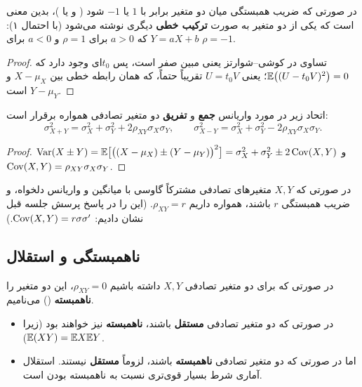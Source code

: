 \begin{theorem}
در صورتی که ضریب همبستگی میان دو متغیر برابر با $1$ یا $-1$ شود ( و یا )، بدین معنی است که یکی از دو متغیر به صورت \textbf{ترکیب خطی} دیگری نوشته می‌شود (با احتمال ۱): $Y=aX+b$ که $a>0$ برای $\rho=1$ و $a<0$ برای $\rho=-1$.
\end{theorem}
\begin{proof}
تساوی در کوشی--شوارتز یعنی مبین صفر است، پس $t_0$ای وجود دارد که $\mathbb{E}\big((U-t_0V)^2\big)=0$؛ یعنی $U=t_0V$ تقریباً حتماً، که همان رابطه خطی بین $X-\mu_X$ و $Y-\mu_Y$ است.
\end{proof}

\begin{theorem}
اتحاد زیر در مورد واریانس \textbf{جمع} و \textbf{تفریق} دو متغیر تصادفی همواره برقرار است:
\[
\sigma_{X+Y}^2=\sigma_X^2+\sigma_Y^2+2\rho_{XY}\sigma_X\sigma_Y,\qquad
\sigma_{X-Y}^2=\sigma_X^2+\sigma_Y^2-2\rho_{XY}\sigma_X\sigma_Y .
\]
\end{theorem}
\begin{proof}
$\operatorname{Var}(X\pm Y)=\mathbb{E}\big[\big((X-\mu_X)\pm(Y-\mu_Y)\big)^2\big]=\sigma_X^2+\sigma_Y^2\pm2\operatorname{Cov}(X,Y)$ و $\operatorname{Cov}(X,Y)=\rho_{XY}\sigma_X\sigma_Y$.
\end{proof}

\begin{summarybox}[نکته]
در صورتی که $X,Y$ متغیرهای تصادفی \textcolor{red!70!black}{مشترکاً گاوسی} با میانگین و واریانس دلخواه، و ضریب همبستگی $r$ باشند، همواره داریم $\rho_{XY}=r$. (این را در پاسخ پرسش جلسه قبل نشان دادیم: $\operatorname{Cov}(X,Y)=r\sigma\sigma'$.)
\end{summarybox}

\subsection{ناهمبستگی و استقلال}
\begin{definition}
در صورتی که برای دو متغیر تصادفی $X,Y$ داشته باشیم $\rho_{XY}=0$، این دو متغیر را \textbf{ناهمبسته} (\textcolor{red!70!black}{}) می‌نامیم.
\end{definition}
\begin{itemize}
\item در صورتی که دو متغیر تصادفی \textbf{مستقل} باشند، \textbf{ناهمبسته} نیز خواهند بود (زیرا $\mathbb{E}(XY)=\mathbb{E} X\mathbb{E} Y$).
\item اما در صورتی که دو متغیر تصادفی \textbf{ناهمبسته} باشند، لزوماً \textbf{مستقل} نیستند. استقلال آماری شرط بسیار قوی‌تری نسبت به ناهمبسته بودن است.
\end{itemize}

